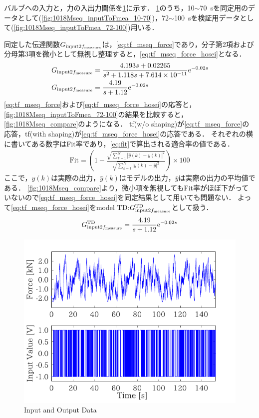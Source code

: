 バルブへの入力と，力の入出力関係を\figname\ref{fig:1018Mseq_inputToFmea}に示す．
\figname\ref{fig:1018Mseq_inputToFmea}のうち，10$\sim$\SI{70}{s}を同定用のデータとして(\figname\ref{fig:1018Mseq_inputToFmea_10-70})，72$\sim$\SI{100}{s}を検証用データとして(\figname\ref{fig:1018Mseq_inputToFmea_72-100})用いる．

同定した伝達関数$G_{\mathrm{input}2f_\mathrm{measure}}$は，\eqnname\ref{eq:tf_mseq_force}であり，分子第2項および分母第3項を微小として無視し整理すると，\eqnname\ref{eq:tf_mseq_force_hosei}となる．
\begin{align}
    \label{eq:tf_mseq_force}
    G_{\mathrm{input}2f_\mathrm{measure}}&=\frac{4.193s+0.02265}{s^2 + 1.118s + 7.614\times 10^{-11}}\mathrm{e}^{-0.02s}\\
    \label{eq:tf_mseq_force_hosei} 
    G_{\mathrm{input}2f_\mathrm{measure}}&= \frac{4.19}{s+1.12}\mathrm{e}^{-0.02s}
\end{align}
\eqnname\ref{eq:tf_mseq_force}および\eqnname\ref{eq:tf_mseq_force_hosei}の応答と，\figname\ref{fig:1018Mseq_inputToFmea_72-100}の結果を比較すると，\figname\ref{fig:1018Mseq_compare}のようになる．
tf(w/o shaping)が\eqnname\ref{eq:tf_mseq_force}の応答，tf(with shaping)が\eqnname\ref{eq:tf_mseq_force_hosei}の応答である．
それぞれの横に書いてある数字はFit率であり，\eqnname\ref{eq:fit}で算出される適合率の値である．
\begin{align}
    \label{eq:fit}
    \mathrm{Fit} =  \left( 1- \frac{\sqrt{\sum_{k=1}^N |\hat{y}(k)-y(k)|^2 }}{\sqrt{\sum_{k=1}^N |{y}(k)-\bar{y}|^2 }}\right) \times 100
\end{align}
ここで，$y(k)$は実際の出力，$\hat{y}(k)$はモデルの出力，$\bar{y}$は実際の出力の平均値である．
\figname\ref{fig:1018Mseq_compare}より，微小項を無視してもFit率がほぼ下がっていないので\eqnname\ref{eq:tf_mseq_force_hosei}を同定結果として用いても問題ない．
よって\eqnname\ref{eq:tf_mseq_force_hosei}をmodel TD:$G_{\mathrm{input}2f_\mathrm{measure}}^{\mathrm{TD}}$として扱う．
\begin{align}
    \label{eq:tf_GTD}
    G_{\mathrm{input}2f_\mathrm{measure}}^{\mathrm{TD}} = \frac{4.19}{s+1.12}\mathrm{e}^{-0.02s}
\end{align}
\begin{figure}[t]
    \centering
        \includegraphics[keepaspectratio, scale=1.0]{contents/システム同定/figure/1018Mseq_inputToFmea.pdf}
        \caption{Input and Output Data}
        \label{fig:1018Mseq_inputToFmea}
\end{figure}
